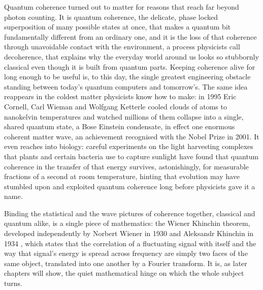 	Quantum coherence turned out to matter for reasons that reach far beyond photon
	counting. It is quantum coherence, the delicate, phase locked superposition of many
	possible states at once, that makes a quantum bit fundamentally different from an
	ordinary one, and it is the loss of that coherence through unavoidable contact with the
	environment, a process physicists call decoherence, that explains why the everyday world
	around us looks so stubbornly classical even though it is built from quantum parts.
	Keeping coherence alive for long enough to be useful is, to this day, the single greatest
	engineering obstacle standing between today's quantum computers and tomorrow's. The same
	idea reappears in the coldest matter physicists know how to make: in 1995 Eric Cornell,
	Carl Wieman and Wolfgang Ketterle cooled clouds of atoms to nanokelvin temperatures and
	watched millions of them collapse into a single, shared quantum state, a Bose Einstein
	condensate, in effect one enormous coherent matter wave, an achievement recognised with
	the Nobel Prize in 2001. It even reaches into biology: careful experiments on the
	light harvesting complexes that plants and certain bacteria use to capture sunlight have
	found that quantum coherence in the transfer of that energy survives, astonishingly, for
	measurable fractions of a second at room temperature, hinting that evolution may have
	stumbled upon and exploited quantum coherence long before physicists gave it a name.

	Binding the statistical and the wave pictures of coherence together, classical and
	quantum alike, is a single piece of mathematics: the Wiener Khinchin theorem, developed
	independently by Norbert Wiener in 1930 \cite{wiener1930generalized} and Aleksandr
	Khinchin in 1934 \cite{khinchin1934korrelationstheorie}, which states that the
	correlation of a fluctuating signal with itself and the way that signal's energy is
	spread across frequency are simply two faces of the same object, translated into one
	another by a Fourier transform. It is, as later chapters will show, the quiet
	mathematical hinge on which the whole subject turns.

